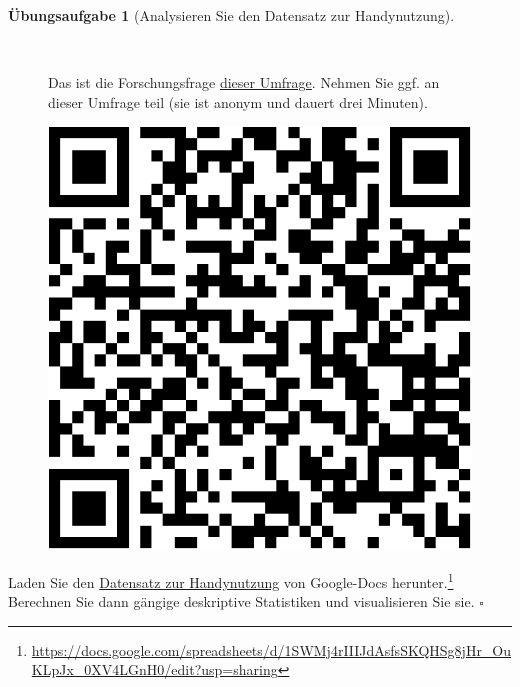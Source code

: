 \documentclass[
  letterpaper,
]{scrbook}
\theoremstyle{definition}
\theoremstyle{definition}
\theoremstyle{definition}
\newtheorem{exercise}{Übungsaufgabe}[chapter]
\theoremstyle{remark}
\begin{document}
\begin{exercise}[Analysieren Sie den Datensatz zur
Handynutzung]\protect\hypertarget{exr-handy}{}\label{exr-handy}

~

\begin{figure}

\begin{minipage}{0.80\linewidth}
Das ist die Forschungsfrage
\href{https://docs.google.com/forms/d/e/1FAIpQLSfM6oDLHX4_lqWq-bXw39drTkdGAvecE6ow2HIKoxdrVygp2A/viewform}{dieser
Umfrage}. Nehmen Sie ggf. an dieser Umfrage teil (sie ist anonym und
dauert drei Minuten).\end{minipage}%
%
\begin{minipage}{0.20\linewidth}

\begin{center}
\includegraphics[width=0.75\linewidth,height=\textheight,keepaspectratio]{060-modellguete_files/figure-pdf/unnamed-chunk-22-1.pdf}
\end{center}

\end{minipage}%

\end{figure}%

Laden Sie den
\href{https://docs.google.com/spreadsheets/d/1SWMj4rIIIJdAsfsSKQHSg8jHr_OuKLpJx_0XV4LGnH0/edit?usp=sharing}{Datensatz
zur Handynutzung} von Google-Docs herunter.\footnote{\url{https://docs.google.com/spreadsheets/d/1SWMj4rIIIJdAsfsSKQHSg8jHr_OuKLpJx_0XV4LGnH0/edit?usp=sharing}}
Berechnen Sie dann gängige deskriptive Statistiken und visualisieren Sie
sie. \(\square\)


\end{exercise}
\end{document}
